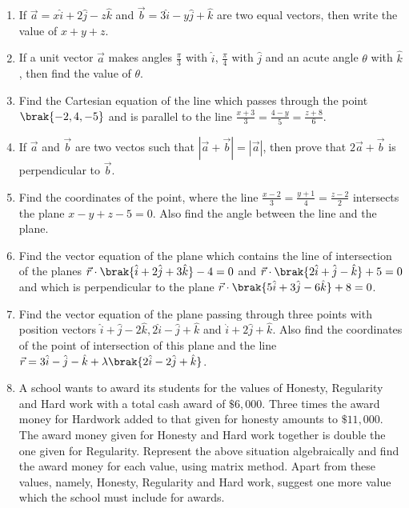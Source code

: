 \documentclass{article}
\begin{document}
\begin{enumerate}
	 \item If $\vec{a}=x\hat{i}+2\hat{j}-z\hat{k}$ and $\vec{b}=3\hat{i}-y\hat{j}+\hat{k}$ are two equal vectors, then write the value of $x+y+z$.
	
	\item If a unit vector $\vec{a}$ makes angles $\frac{\pi}{3}$ with $\hat{i}$, $\frac{\pi}{4}$ with $\hat{j}$ and an acute angle $\theta$ with $\hat{k}$, then find the value of $\theta$.

	\item Find the Cartesian equation of the line which passes through the point $\brak{-2,4,-5}$ and is parallel to the line $\frac{x+3}{3}=\frac{4-y}{5}=\frac{z+8}{6}$.

	\item If $\vec{a}$ and $\vec{b}$ are two vectos such that $|\vec{a}+\vec{b}|=|\vec{a}|$, then prove that $2\vec{a}+\vec{b}$ is perpendicular to $\vec{b}$.

	\item Find the coordinates of the point, where the line $\frac{x-2}{3}=\frac{y+1}{4}=\frac{z-2}{2}$ intersects the plane $x-y+z-5=0$. Also find the angle between the line and the plane.

	\item Find the vector equation of the plane which contains the line of intersection of the planes $\vec{r} \cdot \brak{\hat{i}+2\hat{j}+3\hat{k}}-4=0$ and $\vec{r} \cdot \brak{2\hat{i}+\hat{j}-\hat{k}}+5=0$ and which is perpendicular to the plane $\vec{r} \cdot \brak{5\hat{i}+3\hat{j}-6\hat{k}}+8=0$.

	\item Find the vector equation of the plane passing through three points with position vectors $\hat{i}+\hat{j}-2\hat{k},2\hat{i}-\hat{j}+\hat{k}$ and $\hat{i}+2\hat{j}+\hat{k}$. Also find the coordinates of the point of intersection of this plane and the line $\vec{r}=3\hat{i}-\hat{j}-\hat{k}+\lambda \brak{2\hat{i}-2\hat{j}+\hat{k}}$.

	\item A school wants to award its students for the values of Honesty, Regularity and Hard work with a total cash award of $\$6,000$. Three times the award money for Hardwork added to that given for honesty amounts to $\$11,000$. The award money given for Honesty and Hard work together is double the one given for Regularity. Represent the above situation algebraically and find the award money for each value, using matrix method. Apart from these values, namely, Honesty, Regularity and Hard work, suggest one more value which the school must include for awards.\\


\end{enumerate}
\end{document}
